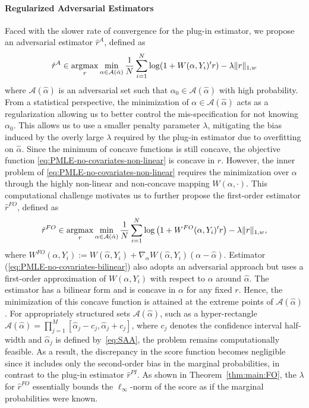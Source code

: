 \documentclass[11pt]{article}
\newcommand{\argmax}{\operatornamewithlimits{argmax}}
\begin{document}
\paragraph{Regularized Adversarial Estimators} Faced with the slower rate of convergence for the plug-in estimator, we propose an adversarial estimator $\hat{r}^A$, defined as 
\begin{equation}\label{eq:PMLE-no-covariates-non-linear}
    \displaystyle \hat r^{A}\in \argmax_{r}\min_{\alpha \in \mathcal{A}(\hat\alpha)}\frac{1}{N}\sum_{i=1}^N \log(1+ W(\alpha,Y_i)'r ) - \lambda \|r\|_{1,w}
\end{equation}
where $\mathcal{A}(\hat{\alpha})$ is an adversarial set such that $\alpha_0 \in \mathcal{A}(\hat{\alpha})$ with high probability. From a statistical perspective, the minimization of  $\alpha \in \mathcal{A}(\hat\alpha)$ acts as a regularization allowing us to better control the mis-specification for not knowing $\alpha_0$. This allows us to use a smaller penalty parameter $\lambda$, mitigating the bias induced by the overly large $\lambda$ required by the plug-in estimator due to overfitting on $\hat{\alpha}$. Since the minimum of concave functions is still concave, the objective function \eqref{eq:PMLE-no-covariates-non-linear} is concave in $r$. However, the inner problem of \eqref{eq:PMLE-no-covariates-non-linear} requires the minimization over $\alpha$ through the highly non-linear and non-concave mapping $W(\alpha,\cdot)$. This computational challenge motivates us to further propose the first-order estimator $\hat{r}^{FO}$, defined as
\begin{equation}\label{eq:PMLE-no-covariates-bilinear}   
    \hat r^{FO}\in\argmax_{r}\min_{\alpha \in \mathcal{A}(\hat\alpha)}\frac{1}{N}\sum_{i=1}^N\log\left(1+W^{FO}(\alpha,Y_i)'r\right)-\lambda \|r\|_{1,w},
\end{equation}
where $W^{FO}(\alpha,Y_i):=W(\hat\alpha,Y_i)+\nabla_{\alpha} W(\hat\alpha,Y_i)(\alpha-\hat\alpha)$.
Estimator (\ref{eq:PMLE-no-covariates-bilinear}) also adopts an adversarial approach but uses a first-order approximation of $W(\alpha,Y_i)$ with respect to $\alpha$ around $\hat{\alpha}$. The estimator has a bilinear form and is concave in $\alpha$ for any fixed $r$. Hence, the minimization of this concave function is attained at the extreme points of $\mathcal{A}(\hat{\alpha})$. For appropriately structured sets $\mathcal{A}(\hat{\alpha})$, such as a hyper-rectangle $\mathcal{A}(\hat{\alpha}) = \prod_{j=1}^M [\hat{\alpha}_j - c_j, \hat{\alpha}_j + c_j]$, where $c_j$ denotes the confidence interval half-width and $\hat{\alpha}_j$ is defined by~\eqref{eq:SAA}, the problem remains computationally feasible. As a result, the discrepancy in the score function becomes negligible since it includes only the second-order bias in the marginal probabilities, in contrast to the plug-in estimator $\hat{r}^{PI}$. As shown in Theorem~\ref{thm:main:FO}, the $\lambda$ for $\hat{r}^{FO}$ essentially bounds the $\ell_\infty$-norm of the score as if the marginal probabilities were known.
\end{document}
